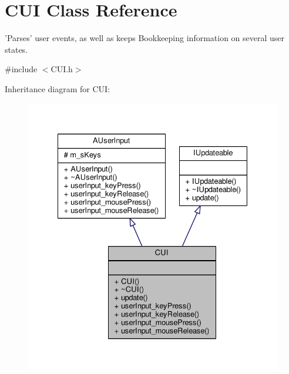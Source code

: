 \hypertarget{classCUI}{\section{C\-U\-I Class Reference}
\label{classCUI}
}


'Parses' user events, as well as keeps Bookkeeping information on several user states.  




{\ttfamily \#include $<$C\-U\-I.\-h$>$}



Inheritance diagram for C\-U\-I\-:\nopagebreak
\begin{figure}[H]
\begin{center}
\leavevmode
\includegraphics[width=331pt]{classCUI__inherit__graph}
\end{center}
\end{figure}


